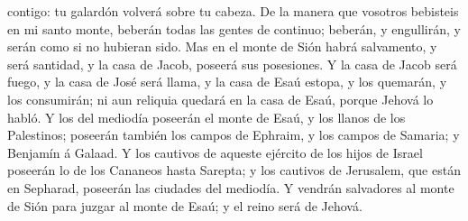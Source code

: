 contigo: tu galardón volverá sobre tu cabeza.  De la
manera que vosotros bebisteis en mi santo monte, beberán todas las
gentes de continuo; beberán, y engullirán, y serán como si no hubieran
sido.  Mas en el monte de Sión habrá salvamento, y será
santidad, y la casa de Jacob, poseerá sus posesiones.  Y
la casa de Jacob será fuego, y la casa de José será llama, y la casa de
Esaú estopa, y los quemarán, y los consumirán; ni aun reliquia quedará
en la casa de Esaú, porque Jehová lo habló.  Y los del
mediodía poseerán el monte de Esaú, y los llanos de los Palestinos;
poseerán también los campos de Ephraim, y los campos de Samaria; y
Benjamín á Galaad.  Y los cautivos de aqueste ejército de
los hijos de Israel poseerán lo de los Cananeos hasta Sarepta; y los
cautivos de Jerusalem, que están en Sepharad, poseerán las ciudades del
mediodía.  Y vendrán salvadores al monte de Sión para
juzgar al monte de Esaú; y el reino será de Jehová.
